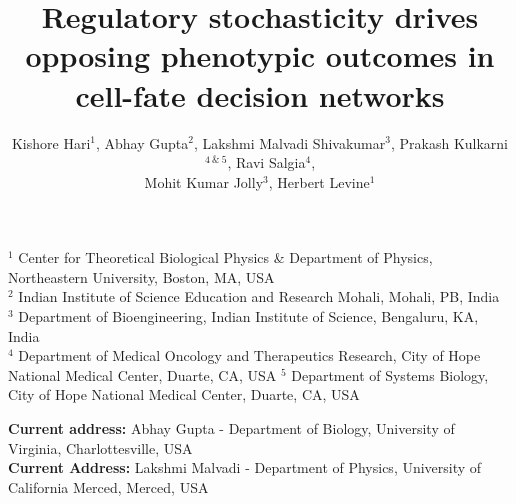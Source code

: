 \documentclass[11pt]{article}
\title{Regulatory stochasticity drives opposing phenotypic outcomes in cell-fate decision networks}
\author{Kishore Hari$^1$, Abhay Gupta$^2$, Lakshmi Malvadi Shivakumar$^3$, Prakash Kulkarni$^{4~\&~5}$, Ravi Salgia$^4$, \\ Mohit Kumar Jolly$^3$, Herbert Levine$^1$}
\providecommand{\DIFaddtex}[1]{{\protect\color{red}#1}} %
\providecommand{\DIFaddbegin}{} %
\providecommand{\DIFaddend}{} %
\providecommand{\DIFadd}[1]{\texorpdfstring{\DIFaddtex{#1}}{#1}} %
\providecommand{\DIFaddincludegraphics}[2][]{\DIFOincludegraphics[#1]{#2}} %
\DeclareRobustCommand{\DIFaddbegin}{\DIFOaddbegin \let\includegraphics\DIFaddincludegraphics} %
\DeclareRobustCommand{\DIFaddend}{\DIFOaddend \let\includegraphics\DIFOincludegraphics} %
\begin{document}
\maketitle
\begin{center}
    $^1$ Center for Theoretical Biological Physics \& Department of Physics, Northeastern University, Boston, MA, USA\\
    $^2$ Indian Institute of Science Education and Research Mohali, Mohali, PB, India\\
    $^3$ Department of Bioengineering, Indian Institute of Science, Bengaluru, KA, India \\
    $^4$ Department of Medical Oncology and Therapeutics Research, \DIFaddbegin \DIFadd{City of }\DIFaddend Hope National Medical Center, Duarte, CA, USA
    $^5$ Department of Systems Biology, City of Hope National Medical Center, Duarte, CA, USA 
\end{center}
\begin{center}
    \small \textbf{Current address:} Abhay Gupta - Department of Biology, University of Virginia, Charlottesville, USA\\
    \small \textbf{Current Address:} Lakshmi Malvadi - Department of Physics, University of California Merced, Merced, USA\\
\end{center}
\end{document}
